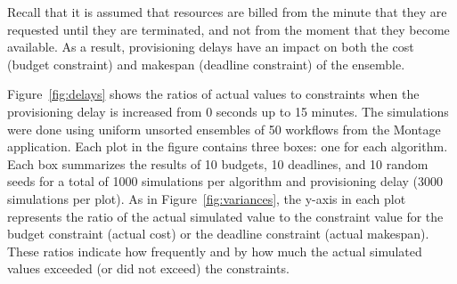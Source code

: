 \documentclass[conference]{IEEEtran}
\begin{document}
Recall that it is assumed that resources are billed from the minute that they are requested until they are terminated, and not from the moment that they become available. As a result, provisioning delays have an impact on both the cost (budget constraint) and makespan (deadline constraint) of the ensemble.

Figure~\ref{fig:delays} shows the ratios of actual values to constraints when the provisioning delay is increased from 0 seconds up to 15 minutes. The simulations were done using uniform unsorted ensembles of 50 workflows from the Montage application. Each plot in the figure contains three boxes: one for each algorithm. Each box summarizes the results of 10 budgets, 10 deadlines, and 10 random seeds for a total of 1000 simulations per algorithm and provisioning delay (3000 simulations per plot). As in Figure~\ref{fig:variances}, the y-axis in each plot represents the ratio of the actual simulated value to the constraint value for the budget constraint (actual cost) or the deadline constraint (actual makespan). These ratios indicate how frequently and by how much the actual simulated values exceeded (or did not exceed) the constraints.

\end{document}
